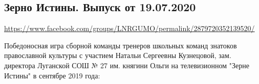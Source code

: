  
 
  
\subsection{Зерно Истины. Выпуск от 19.07.2020}
\url{https://www.facebook.com/groups/LNRGUMO/permalink/2879720352139520/}

Победоносная игра сборной команды тренеров школьных команд знатоков
православной культуры с участием Натальи Сергеевны Кузнецовой, зам. директора
Луганской СОШ № 27 им. княгини Ольги на телевизионном "Зерне Истины" в сентябре
2019 года:
